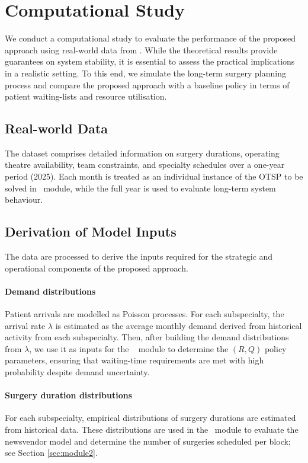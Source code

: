 \section{Computational Study\label{sec:experiments}}
We conduct a computational study to evaluate the performance of the proposed approach using real-world data from \hcunicamp. 
While the theoretical results provide guarantees on system stability, it is essential to assess the practical implications in a realistic setting.
To this end, we simulate the long-term surgery planning process and compare the proposed approach with a baseline policy in terms of patient waiting-lists and resource utilisation.

\subsection{Real-world Data\label{instances}}
The dataset comprises detailed information on surgery durations, operating theatre availability, team constraints, and specialty schedules over a one-year period (2025). 
Each month is treated as an individual instance of the OTSP to be solved in \otschedmodule~module, while the full year is used to evaluate long-term system behaviour.

\subsection{Derivation of Model Inputs}
The data are processed to derive the inputs required for the strategic and operational components of the proposed approach.

\paragraph{\textbf{Demand distributions}}
Patient arrivals are modelled as Poisson processes. 
For each subspecialty, the arrival rate $\lambda$ is estimated as the average monthly demand derived from historical activity from each subspecialty.
Then, after building the demand distributions from $\lambda$, we use it as inputs for the \rqmodule~ module to determine the $(R,Q)$ policy parameters, ensuring that waiting-time requirements are met with high probability despite demand uncertainty.

\paragraph{\textbf{Surgery duration distributions}}
For each subspecialty, empirical distributions of surgery durations are estimated from historical data. 
These distributions are used in the \overtimemodule~module to evaluate the newsvendor model and determine the number of surgeries scheduled per block; see Section \ref{sec:module2}.

